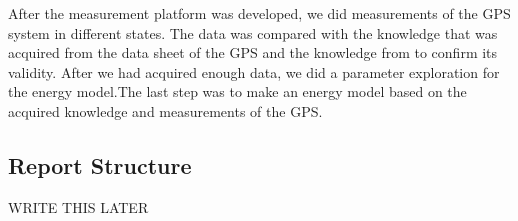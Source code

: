 \vspace{5mm}After the measurement platform was developed, we did measurements of the GPS system in different states. The data was compared with the knowledge that was acquired from the data sheet of the GPS and the knowledge from \cite{GPS} to confirm its validity. After we had acquired enough data, we did a parameter exploration for the energy model.The last step was to make an energy model based on the acquired knowledge and measurements of the GPS. 



\subsection{Report Structure}

WRITE THIS LATER 


\newpage